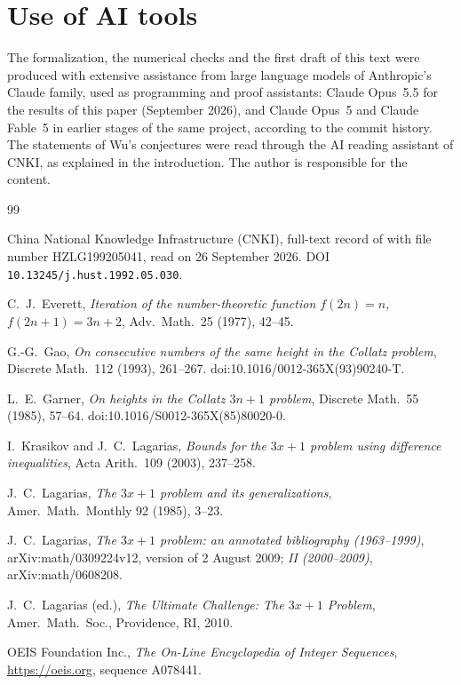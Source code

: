 \documentclass[11pt]{amsart}
\theoremstyle{definition}
\theoremstyle{remark}
\begin{document}
\section*{Use of AI tools}
The formalization, the numerical checks and the first draft of this text were produced with extensive assistance from large language models of Anthropic's Claude family, used as programming and proof assistants: Claude Opus~5.5 for the results of this paper (September 2026), and Claude Opus~5 and Claude Fable~5 in earlier stages of the same project, according to the commit history. The statements of Wu's conjectures were read through the AI reading assistant of CNKI, as explained in the introduction. The author is responsible for the content.

\begin{thebibliography}{99}

 China National Knowledge Infrastructure (CNKI), full-text record of \cite{Wu92} with file number HZLG199205041, read on 26 September 2026. DOI \nolinkurl{10.13245/j.hust.1992.05.030}.

 C.~J.~Everett, \emph{Iteration of the number-theoretic function $f(2n)=n$, $f(2n+1)=3n+2$}, Adv.\ Math.\ 25 (1977), 42--45.

 G.-G.~Gao, \emph{On consecutive numbers of the same height in the Collatz problem}, Discrete Math.\ 112 (1993), 261--267. doi:10.1016/0012-365X(93)90240-T.

 L.~E.~Garner, \emph{On heights in the Collatz $3n+1$ problem}, Discrete Math.\ 55 (1985), 57--64. doi:10.1016/S0012-365X(85)80020-0.

 I.~Krasikov and J.~C.~Lagarias, \emph{Bounds for the $3x+1$ problem using difference inequalities}, Acta Arith.\ 109 (2003), 237--258.

 J.~C.~Lagarias, \emph{The $3x+1$ problem and its generalizations}, Amer.\ Math.\ Monthly 92 (1985), 3--23.

 J.~C.~Lagarias, \emph{The $3x+1$ problem: an annotated bibliography (1963--1999)}, arXiv:math/0309224v12, version of 2 August 2009; \emph{II (2000--2009)}, arXiv:math/0608208.

 J.~C.~Lagarias (ed.), \emph{The Ultimate Challenge: The $3x+1$ Problem}, Amer.\ Math.\ Soc., Providence, RI, 2010.

 OEIS Foundation Inc., \emph{The On-Line Encyclopedia of Integer Sequences}, \url{https://oeis.org}, sequence A078441.


\end{thebibliography}
\end{document}
